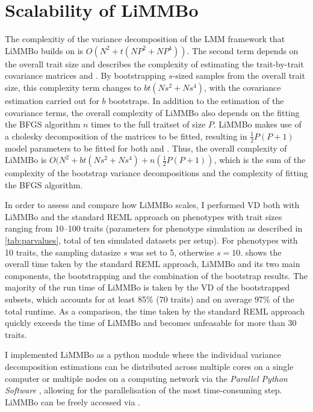 \section{Scalability of LiMMBo}
\label{section:scalability-limmbo}
The complexitiy of the variance decomposition of the LMM framework that LiMMBo builds on is \(O(N^2 + t(NP^2 + NP^4))\). The second term depends on the overall trait size and describes the complexity of estimating the trait-by-trait covariance matrices   and  . By bootstrapping \(s\)-sized samples from the overall trait size, this complexity term changes to \(bt(Ns^2 + Ns^4)\), with the covariance estimation carried out for \(b\) bootstraps. In addition to the estimation of the covariance terms, the overall complexity of LiMMBo also depends on the fitting the BFGS algorithm \(n\) times to the full traitset of size \(P\). LiMMBo makes use of a cholesky decomposition of the matrices to be fitted, resulting in $\frac{1}{2}P(P+1)$ model parameters to be fitted for both   and  . Thus, the overall complexity of LiMMBo is \(O(N^2 + bt(Ns^2 + Ns^4) + n(\frac{1}{2}P(P+1))\), which is the sum of the complexity of the bootstrap variance decompositions and the complexity of fitting the BFGS algorithm.  

In order to assess and compare how LiMMBo scales, I performed VD both with LiMMBo and the standard REML approach on phenotypes with trait sizes ranging from \numrange{10}{100} traits (parameters for phenotype simulation as described in \cref{tab:parvalues}, total of ten simulated datasets per setup). For phenotypes with \num{10} traits, the sampling datasize \(s\) was set to \num{5}, otherwise  \(s=10\).   shows the overall time taken by the standard REML approach, LiMMBo and its two main components, the bootstrapping and the combination of the bootstrap results. The majority of the run time of LiMMBo is taken by the VD of the bootstrapped subsets, which accounts for at least \num{85}\%  (\num{70} traits) and on average \num{97}\%  of the total runtime. As a comparison, the time taken by the standard REML approach quickly exceeds the time of LiMMBo and becomes unfeasable for more than \num{30} traits. 

I implemented LiMMBo as a python module where the individual variance decomposition estimations can be distributed across multiple cores on a single computer or multiple nodes on a computing network via the \textit{Parallel Python Software} \citep{PPSoftware}, allowing for the parallelisation of the most time-consuming step. LiMMBo can be freely accessed via .


